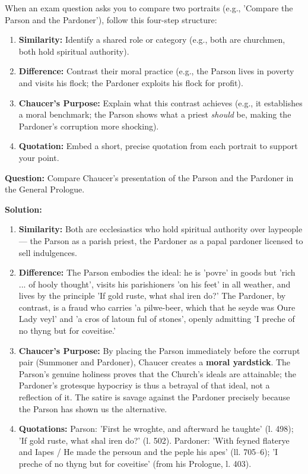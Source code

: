 \documentclass[11pt]{article}
\newcounter{popsec}
\newcounter{popsub}
\newcommand{\courssub}[1]{%
  \stepcounter{popsub}%
  \par\vspace{9pt}\noindent{\popxbold\fontsize{11.5}{13}\selectfont\color{popink}{\color{poporange}\thepopsec.\thepopsub}\hspace{6pt}#1}\par\nopagebreak\vspace{4pt}
}
\begin{document}
\courssub{Method: Comparing Two Portraits}

\begin{methode}
When an exam question asks you to compare two portraits (e.g., 'Compare the Parson and the Pardoner'), follow this four-step structure:
\begin{enumerate}
\item \textbf{Similarity:} Identify a shared role or category (e.g., both are churchmen, both hold spiritual authority).
\item \textbf{Difference:} Contrast their moral practice (e.g., the Parson lives in poverty and visits his flock; the Pardoner exploits his flock for profit).
\item \textbf{Chaucer's Purpose:} Explain what this contrast achieves (e.g., it establishes a moral benchmark; the Parson shows what a priest \emph{should} be, making the Pardoner's corruption more shocking).
\item \textbf{Quotation:} Embed a short, precise quotation from each portrait to support your point.
\end{enumerate}
\end{methode}

\begin{exoresolu}
\textbf{Question:} Compare Chaucer's presentation of the Parson and the Pardoner in the General Prologue.

\textbf{Solution:}
\begin{enumerate}
\item \textbf{Similarity:} Both are ecclesiastics who hold spiritual authority over laypeople — the Parson as a parish priest, the Pardoner as a papal pardoner licensed to sell indulgences.
\item \textbf{Difference:} The Parson embodies the ideal: he is 'povre' in goods but 'rich ... of hooly thought', visits his parishioners 'on his feet' in all weather, and lives by the principle 'If gold ruste, what shal iren do?' The Pardoner, by contrast, is a fraud who carries 'a pilwe-beer, which that he seyde was Oure Lady veyl' and 'a cros of latoun ful of stones', openly admitting 'I preche of no thyng but for coveitise.'
\item \textbf{Chaucer's Purpose:} By placing the Parson immediately before the corrupt pair (Summoner and Pardoner), Chaucer creates a \textbf{moral yardstick}. The Parson's genuine holiness proves that the Church's ideals are attainable; the Pardoner's grotesque hypocrisy is thus a betrayal of that ideal, not a reflection of it. The satire is savage against the Pardoner precisely because the Parson has shown us the alternative.
\item \textbf{Quotations:} Parson: 'First he wroghte, and afterward he taughte' (l. 498); 'If gold ruste, what shal iren do?' (l. 502). Pardoner: 'With feyned flaterye and Iapes / He made the persoun and the peple his apes' (ll. 705–6); 'I preche of no thyng but for coveitise' (from his Prologue, l. 403).
\end{enumerate}
\end{exoresolu}
\end{document}
